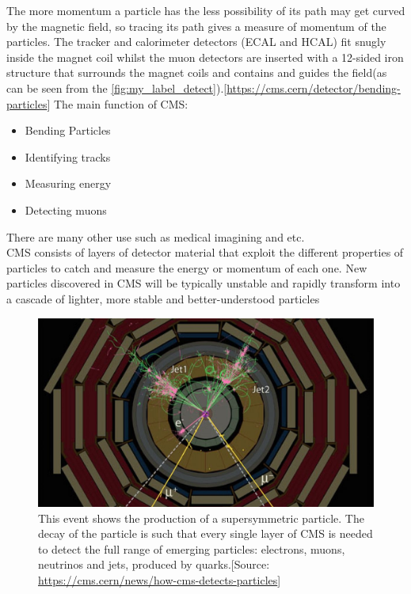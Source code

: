 The more momentum a particle has the less possibility of its path may get curved by the magnetic field, so tracing its path gives a measure of momentum of the particles. The tracker and calorimeter detectors (ECAL and HCAL) fit snugly inside the magnet coil whilst the muon detectors are inserted with a 12-sided iron structure that surrounds the magnet coils and contains and guides the field(as can be seen from the \autoref{fig:my_label_detect}).[\url{https://cms.cern/detector/bending-particles}]
The main function of CMS:
\begin{itemize}
    \item Bending Particles
    \item Identifying tracks
    \item Measuring energy
    \item Detecting muons
\end{itemize}
There are many other use such as medical imagining and etc.\\

 CMS consists of layers of detector material that exploit the different properties of particles to catch and measure the energy or momentum of each one. New particles discovered in CMS will be typically unstable and rapidly transform into a cascade of lighter, more stable and better-understood particles

\begin{figure}[h]
    \centering
    \includegraphics[scale=0.3]{Figures/SusyAny.jpg}
    \caption{This event shows the production of a supersymmetric particle. The decay of the particle is such that every single layer of CMS is needed to detect the full range of emerging particles: electrons, muons, neutrinos and jets, produced by quarks.[Source: \url{https://cms.cern/news/how-cms-detects-particles}]}
    \label{fig:my_label}
\end{figure}


